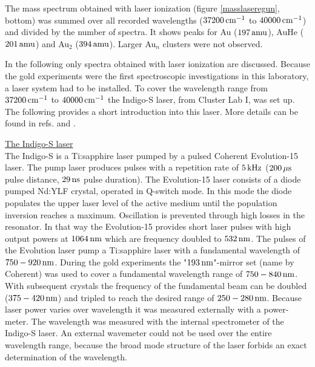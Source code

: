 \documentclass[parskip,12pt,headsepline,a4paper] {scrbook}
\begin{document}
The mass spectrum obtained with laser ionization (figure \ref{masslaseregun}, bottom) was summed over all recorded wavelengths ($\unit[37200]{cm^{-1}}$ to $\unit[40000]{cm^{-1}}$) and divided by the number of spectra. It shows peaks for Au ($\unit[197]{amu}$), AuHe ($\unit[201]{amu}$) and Au$_2$ ($\unit[394]{amu}$). Larger Au$_n$ clusters were not observed.

In the following only spectra obtained with laser ionization are discussed. Because the gold experiments were the first spectroscopic investigations in this laboratory, a laser system had to be installed. To cover the wavelength range from $\unit[37200]{cm^{-1}}$ to $\unit[40000]{cm^{-1}}$ the Indigo-S laser, from Cluster Lab I, was set up. The following provides a short introduction into this laser. More details can be found in refs. \cite{lackner} and \cite{pifrader}.

\underline{The Indigo-S laser} \\
The Indigo-S is a Ti:sapphire laser pumped by a pulsed Coherent Evolution-15 laser. The pump laser produces pulses with a repetition rate of $\unit[5]{kHz}$ ($\unit[200]{\mu s}$ pulse distance, $\unit[29]{ns}$ pulse duration). The Evolution-15 laser consists of a diode pumped Nd:YLF crystal, operated in Q-switch mode. In this mode the diode populates the upper laser level of the active medium until the population inversion reaches a maximum. Oscillation is prevented through high losses in the resonator. In that way the Evolution-15 provides short laser pulses with high output powers at $\unit[1064]{nm}$ which are frequency doubled to $\unit[532]{nm}$. The pulses of the Evolution laser pump a Ti:sapphire laser with a fundamental wavelength of $\unit[750-920]{nm}$. During the gold experiments the "$\unit[193]{nm}$"-mirror set (name by Coherent) was used to cover a fundamental wavelength range of $\unit[750-840]{nm}$. With subsequent crystals the frequency of the fundamental beam can be doubled ($\unit[375-420]{nm}$) and tripled to reach the desired range of $\unit[250-280]{nm}$. Because laser power varies over wavelength it was measured externally with a power-meter. The wavelength was measured with the internal spectrometer of the Indigo-S laser. An external wavemeter could not be used over the entire wavelength range, because the broad mode structure of the laser forbids an exact determination of the wavelength.

\newpage
\end{document}

